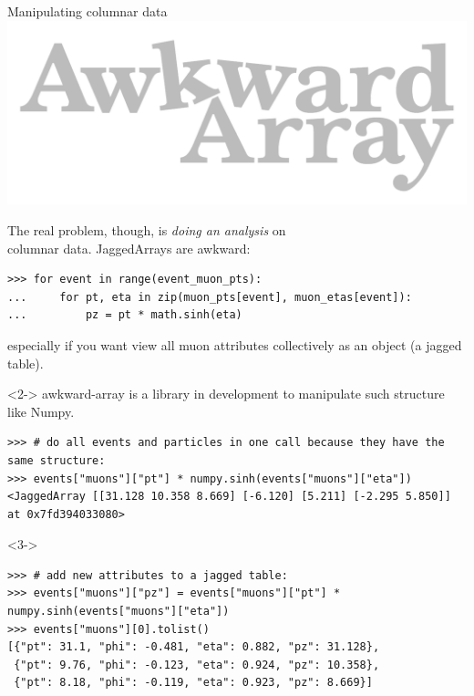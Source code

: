 \documentclass[aspectratio=169]{beamer}
\begin{document}
\begin{frame}[fragile]{Manipulating columnar data}
\vspace{0.5 cm}
\hfill \includegraphics[height=2 cm]{awkward-logo.pdf}

\vspace{-2 cm}
The real problem, though, is {\it doing an analysis} on \\
columnar data. JaggedArrays are awkward:

\scriptsize
\begin{verbatim}
>>> for event in range(event_muon_pts):
...     for pt, eta in zip(muon_pts[event], muon_etas[event]):
...         pz = pt * math.sinh(eta)
\end{verbatim}

\normalsize
especially if you want view all muon attributes collectively as an object (a jagged table).

\vspace{0.25 cm}
\begin{uncoverenv}<2->
awkward-array is a library in development to manipulate such structure like Numpy.

\scriptsize
\begin{verbatim}
>>> # do all events and particles in one call because they have the same structure:
>>> events["muons"]["pt"] * numpy.sinh(events["muons"]["eta"])
<JaggedArray [[31.128 10.358 8.669] [-6.120] [5.211] [-2.295 5.850]] at 0x7fd394033080>
\end{verbatim}
\end{uncoverenv}

\begin{uncoverenv}<3->
\scriptsize
\begin{verbatim}
>>> # add new attributes to a jagged table:
>>> events["muons"]["pz"] = events["muons"]["pt"] * numpy.sinh(events["muons"]["eta"])
>>> events["muons"][0].tolist()
[{"pt": 31.1, "phi": -0.481, "eta": 0.882, "pz": 31.128},
 {"pt": 9.76, "phi": -0.123, "eta": 0.924, "pz": 10.358},
 {"pt": 8.18, "phi": -0.119, "eta": 0.923, "pz": 8.669}]
\end{verbatim}
\end{uncoverenv}
\end{frame}
\end{document}
